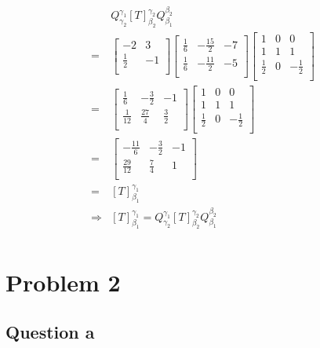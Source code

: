 \documentclass{article}
\begin{document}
\begin{equation*}
\begin{split}
&Q^{\gamma_1}_{\gamma_2} \left[T\right]^{\gamma_2}_{\beta_2} Q^{\beta_2}_{\beta_1}\\
=&\begin{bmatrix}
-2&3\\
\frac{1}{2}&-1\\
\end{bmatrix}
\begin{bmatrix}
\frac{1}{6}&-\frac{15}{2}&-7\\
\frac{1}{6}&-\frac{11}{2}&-5\\
\end{bmatrix}
\begin{bmatrix}
1&0&0\\
1&1&1\\
\frac{1}{2}&0&-\frac{1}{2}\\
\end{bmatrix}\\
=&\begin{bmatrix}
\frac{1}{6}&-\frac{3}{2}&-1\\
\frac{1}{12}&\frac{27}{4}&\frac{3}{2}\\
\end{bmatrix}
\begin{bmatrix}
1&0&0\\
1&1&1\\
\frac{1}{2}&0&-\frac{1}{2}\\
\end{bmatrix}\\
=&\begin{bmatrix}
-\frac{11}{6}&-\frac{3}{2}&-1\\
\frac{29}{12}&\frac{7}{4}&1\\
\end{bmatrix}\\
=&\left[T\right]^{\gamma_1}_{\beta_1}\\
\Rightarrow& \left[T\right]^{\gamma_1}_{\beta_1} =Q^{\gamma_1}_{\gamma_2} \left[T\right]^{\gamma_2}_{\beta_2} Q^{\beta_2}_{\beta_1}\\
\end{split}
\end{equation*}

\newpage

\section{Problem 2}

\subsection{Question a}
\end{document}
